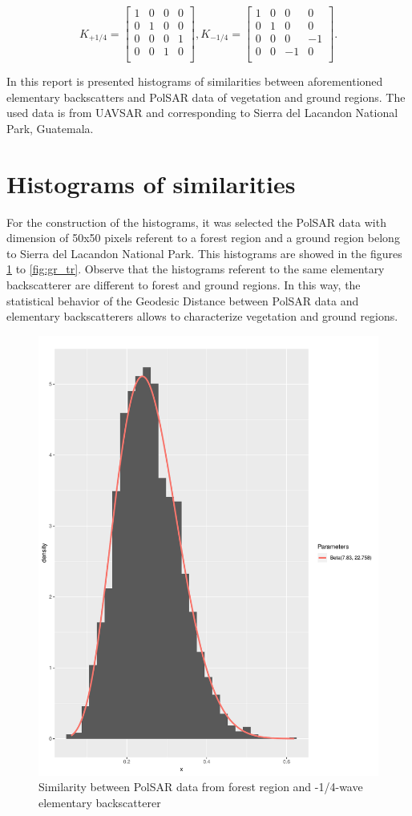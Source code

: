 \documentclass[conference]{IEEEtran}
\begin{document}
\[K_{+1/4}=
\begin{bmatrix}
1 & 0 & 0 & 0\\
0 & 1 & 0 & 0\\
0 & 0 & 0 & 1\\
0 & 0 & 1 & 0\\
\end{bmatrix},
K_{-1/4}=
\begin{bmatrix}
1 & 0 & 0 & 0\\
0 & 1 & 0 & 0\\
0 & 0 & 0 & -1\\
0 & 0 & -1 & 0\\
\end{bmatrix}
.\]

In this report is presented histograms of similarities between aforementioned elementary backscatters and PolSAR data of vegetation and ground regions. The used data is from UAVSAR and corresponding to Sierra  del  Lacandon  National  Park,  Guatemala. 

\section{Histograms of similarities}

For the construction of the histograms, it was selected the PolSAR data with dimension of 50x50 pixels referent to a forest region and a ground region belong to Sierra  del  Lacandon  National  Park. This histograms are showed in the figures \ref{fig:fr_wvn} to \ref{fig:gr_tr}. Observe that the histograms referent to the same elementary backscatterer are different to forest and ground regions. In this way, the statistical behavior of the Geodesic Distance between PolSAR data and elementary backscatterers allows to characterize vegetation and ground regions.

\begin{figure}[!ht]
    \vspace{.1\linewidth}
    \centering
    \includegraphics[width = .9\linewidth, height = .7\linewidth]{../../../Figures/paper_19_05/wvn_vegetation.pdf}
    \caption{Similarity between PolSAR data from forest region and -1/4-wave elementary backscatterer}
    \label{fig:fr_wvn}
\end{figure}
\end{document}
